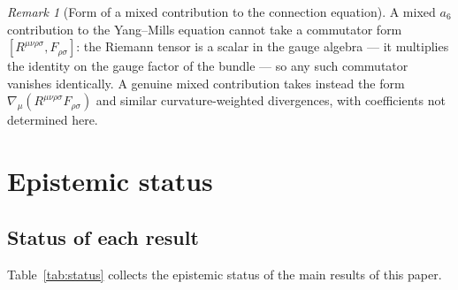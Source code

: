 \documentclass[12pt,a4paper]{article}
\theoremstyle{remark}
\newtheorem{remark}[theorem]{Remark}
\begin{document}
      \begin{remark}[Form of a mixed contribution to the connection equation]
        \label{rem:no-commutator}
        A mixed $a_6$ contribution to the Yang--Mills equation cannot take a commutator form
        $[R^{\mu\nu\rho\sigma},F_{\rho\sigma}]$: the Riemann tensor is a scalar in the gauge
        algebra --- it multiplies the identity on the gauge factor of the bundle --- so any such
        commutator vanishes identically.
        A genuine mixed contribution takes instead the form
        $\nabla_\mu\!\left(R^{\mu\nu\rho\sigma}F_{\rho\sigma}\right)$ and similar
        curvature-weighted divergences, with coefficients not determined here.
      \end{remark}

  \section{Epistemic status}
    \label{sec:epistemic}

    \subsection{Status of each result}
      \label{ssec:status}

      Table~\ref{tab:status} collects the epistemic status of the main results of this paper.
\end{document}

